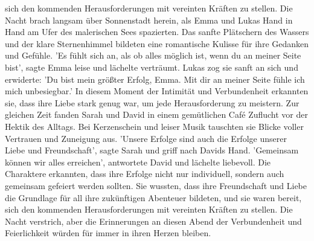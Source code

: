 \documentclass[12pt]{article} %
\begin{document}
sich den kommenden Herausforderungen mit vereinten Kräften zu stellen. Die Nacht brach langsam über Sonnenstadt herein, als Emma und Lukas Hand in Hand am Ufer des malerischen Sees spazierten. Das sanfte Plätschern des Wassers und der klare Sternenhimmel bildeten eine romantische Kulisse für ihre Gedanken und Gefühle. 'Es fühlt sich an, als ob alles möglich ist, wenn du an meiner Seite bist', sagte Emma leise und lächelte verträumt. Lukas zog sie sanft an sich und erwiderte: 'Du bist mein größter Erfolg, Emma. Mit dir an meiner Seite fühle ich mich unbesiegbar.' In diesem Moment der Intimität und Verbundenheit erkannten sie, dass ihre Liebe stark genug war, um jede Herausforderung zu meistern. Zur gleichen Zeit fanden Sarah und David in einem gemütlichen Café Zuflucht vor der Hektik des Alltags. Bei Kerzenschein und leiser Musik tauschten sie Blicke voller Vertrauen und Zuneigung aus. 'Unsere Erfolge sind auch die Erfolge unserer Liebe und Freundschaft', sagte Sarah und griff nach Davids Hand. 'Gemeinsam können wir alles erreichen', antwortete David und lächelte liebevoll. Die Charaktere erkannten, dass ihre Erfolge nicht nur individuell, sondern auch gemeinsam gefeiert werden sollten. Sie wussten, dass ihre Freundschaft und Liebe die Grundlage für all ihre zukünftigen Abenteuer bildeten, und sie waren bereit, sich den kommenden Herausforderungen mit vereinten Kräften zu stellen. Die Nacht verstrich, aber die Erinnerungen an diesen Abend der Verbundenheit und Feierlichkeit würden für immer in ihren Herzen bleiben.
\end{document}
